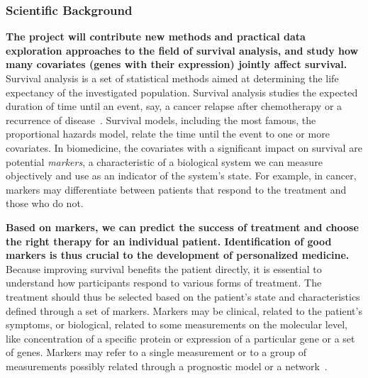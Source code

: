 \documentclass[11pt,a4paper]{article}
\renewcommand{\bold}{\textbf}
\begin{document}
\subsubsection*{Scientific Background}

\bold{The project will contribute new methods and practical data exploration approaches to the field of survival analysis, and study how many covariates (genes with their expression) jointly affect survival.} Survival analysis is a set of statistical methods aimed at determining the life expectancy of the investigated population. Survival analysis studies the expected duration of time until an event, say, a cancer relapse after chemotherapy or a recurrence of disease~\cite{pazdur2008endpoints}. Survival models, including the most famous, the proportional hazards model, relate the time until the event to one or more covariates. In biomedicine, the covariates with a significant impact on survival are potential {\em markers}, a characteristic of a biological system we can measure objectively and use as an indicator of the system's state. For example, in cancer, markers may differentiate between patients that respond to the treatment and those who do not.

\bold{Based on markers, we can predict the success of treatment and choose the right therapy for an individual patient. Identification of good markers is thus crucial to the development of personalized medicine.} Because improving survival benefits the patient directly, it is essential to understand how participants respond to various forms of treatment. The treatment should thus be selected based on the patient's state and characteristics defined through a set of markers. Markers may be clinical, related to the patient's symptoms, or biological, related to some measurements on the molecular level, like concentration of a specific protein or expression of a particular gene or a set of genes. Markers may refer to a single measurement or to a group of measurements possibly related through a prognostic model or a network~\cite{Sonawane2019}.
\end{document}
